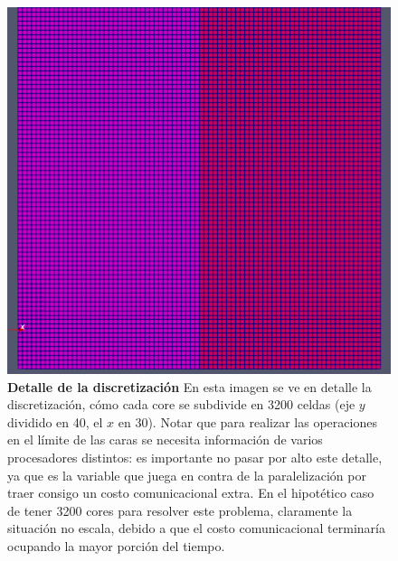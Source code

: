 \documentclass{article}
\begin{document}
\begin{figure}[H] 
    \centering
    \includegraphics[scale=0.5]{../res/imgs/image3.png}
    \caption{\textbf{Detalle de la discretización} En esta imagen se ve en detalle la discretización, cómo cada core se subdivide en 3200 celdas (eje $y$ dividido en 40, el $x$ en 30). Notar que para realizar las operaciones en el límite de las caras se necesita información de varios procesadores distintos: es importante no pasar por alto este detalle, ya que es la variable que juega en contra de la paralelización por traer consigo un costo comunicacional extra. En el hipotético caso de tener 3200 cores para resolver este problema, claramente la situación no escala, debido a que el costo comunicacional terminaría ocupando la mayor porción del tiempo.}
\end{figure}
\end{document}
